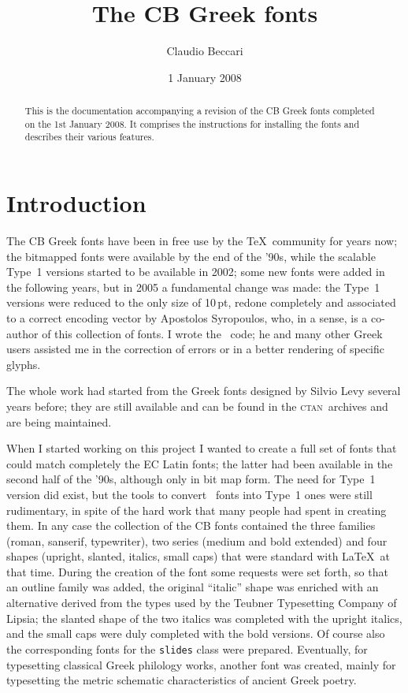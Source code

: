 \documentclass{article}
\author{Claudio Beccari}
\title{The CB Greek fonts}
\date{1 January 2008}
\newcommand*\ctan{\textsc{ctan}}
\begin{document}
\maketitle
\begin{abstract}
This is the documentation accompanying a revision of the CB Greek fonts completed on the 1st January 2008. It comprises the instructions for installing the fonts and describes their various features. 
\end{abstract}

\section{Introduction}
The CB Greek fonts have been in free use by the \TeX\ community for years now; the bitmapped fonts were available by the end of the '90s, while the scalable Type~1 versions started to be available in 2002; some new fonts were added in the following years, but in 2005 a fundamental change was made: the Type~1 versions were reduced to the only size of 10\,pt, redone completely and associated to a correct encoding vector by Apostolos Syropoulos, who, in a sense, is a co-author of this collection of fonts. I wrote the \MF\ code; he and many other Greek users assisted me in the correction of errors or in a better rendering of specific glyphs.

The whole work had started from the Greek fonts designed by Silvio Levy several years before; they are still available and can be found in the \ctan\ archives and are being maintained.

When I started working on this project I wanted to create a full set of fonts that could match completely the EC Latin fonts; the latter had been available in the second half of the '90s, although only in bit map form. The need for Type~1 version did exist, but the tools to convert \MF\ fonts into Type~1 ones were still rudimentary, in spite of the hard work that many people had spent in creating them. In any case the collection of the CB fonts contained the three families (roman, sanserif, typewriter), two series (medium and bold extended) and four shapes (upright, slanted, italics, small caps) that were standard with \LaTeX\ at that time. During the creation of the font some requests were set forth, so that an outline family was added, the original ``italic'' shape was enriched with an alternative derived from the types used by the Teubner Typesetting Company of Lipsia; the slanted shape of the two italics was completed with the upright italics, and the small caps were duly completed with the bold versions. Of course also the corresponding fonts for the \texttt{slides} class were prepared. Eventually, for typesetting classical Greek philology works, another font was created, mainly for typesetting the metric schematic characteristics of ancient Greek poetry.
\end{document}
